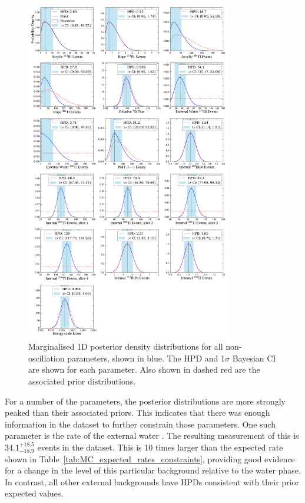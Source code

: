 \begin{figure}
    \centering
    \includegraphics[width=0.8\textwidth]{6_SolarAnalysis/images/posterior_densities_plot_no_osc.pdf}
    \caption[Marginalised 1D posterior density distributions for all non-oscillation parameters]
    {Marginalised 1D posterior density distributions for all non-oscillation parameters, shown in blue. The HPD and 1$\sigma$ Bayesian CI are shown for each parameter. Also shown in dashed red are the associated prior distributions.}
    \label{fig:nuisance_params_marged}
\end{figure}

For a number of the parameters, the posterior distributions are more strongly peaked than their associated priors. This indicates that there was enough information in the dataset to further constrain those parameters. One such parameter is the rate of the external water . The resulting measurement of this is $34.1^{+18.5}_{-18.9}$ events in the dataset. This is 10 times larger than the expected rate shown in Table~\ref{tab:MC_expected_rates_constraints}, providing good evidence for a change in the level of this particular background relative to the water phase. In contrast, all other external backgrounds have HPDs consistent with their prior expected values.

